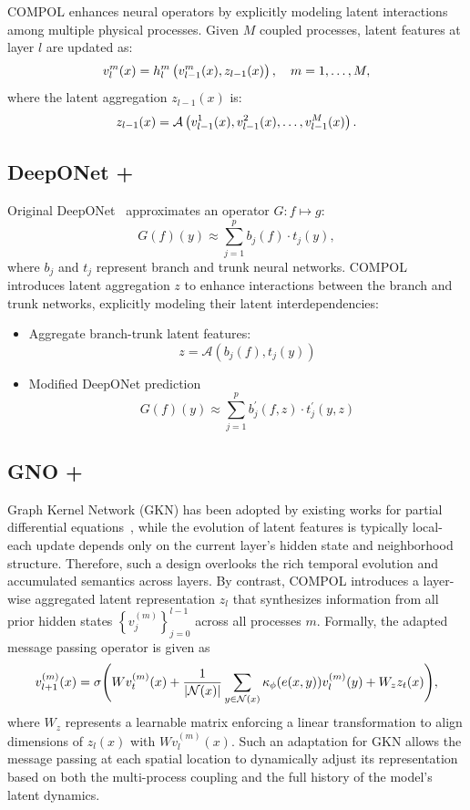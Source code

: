 COMPOL enhances neural operators by explicitly modeling latent interactions among multiple physical processes. Given $M$ coupled processes, latent features at layer $l$ are updated as:
\begin{equation}
	v_l^{m}(x) = h_l^{m}\left(v_{l-1}^{m}(x), z_{l-1}(x)\right),\quad m=1,\dots,M,\notag
\end{equation}
where the latent aggregation $z_{l-1}(x)$ is:
\begin{equation}
	z_{l-1}(x) = \mathcal{A}\left(v_{l-1}^{1}(x), v_{l-1}^{2}(x), \dots,\notag v_{l-1}^{M}(x)\right).
\end{equation}

\subsection{DeepONet + \ours}
Original DeepONet~\citep{lu2021learning} approximates an operator $G: f \mapsto g$:
\[
	G(f)(y) \approx \sum_{j=1}^p b_j(f) \cdot t_j(y),
\]
where $b_j$ and $t_j$ represent branch and trunk neural networks. COMPOL introduces latent aggregation $z$ to enhance interactions between the branch and trunk networks, explicitly modeling their latent interdependencies:
\begin{itemize}
	\item Aggregate branch-trunk latent features:
	\[
		z=\mathcal{A}\left(b_j(f), t_j(y)\right)
	\]
	\item Modified DeepONet prediction
	\[
		G(f)(y) \approx \sum_{j=1}^p b_j^{\prime}(f, z) \cdot t_j^{\prime}(y, z)
	\]
\end{itemize}

\subsection{GNO + \ours}
Graph Kernel Network (GKN) has been adopted by existing works for partial differential equations~\cite{li2020neural}, while the evolution of latent features is typically local-each update depends only on the current layer's hidden state and neighborhood structure. Therefore, such a design overlooks the rich temporal evolution and accumulated semantics across layers. By contrast, COMPOL introduces a layer-wise aggregated latent representation $z_l$ that synthesizes information from all prior hidden states $\left\{v_j^{(m)}\right\}_{j=0}^{l-1}$ across all processes $m$. Formally, the adapted message passing operator is given as
\begin{align}
	v^{(m)}_{l+1}(x) = \sigma\Bigg(
	W v^{(m)}_t(x) +
	\frac{1}{|\mathcal{N}(x)|} \sum_{y \in \mathcal{N}(x)} \kappa_\phi(e(x, y)) v^{(m)}_l(y) + W_z z_t(x)\notag
	\Bigg),
\end{align}
where $W_z$ represents a learnable matrix enforcing a linear transformation to align dimensions of $z_l(x)$ with $W v^{(m)}_l(x)$. Such an adaptation for GKN allows the message passing at each spatial location to dynamically adjust its representation based on both the multi-process coupling and the full history of the model's latent dynamics. 

